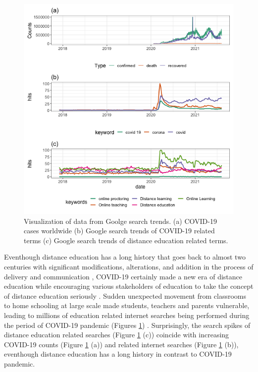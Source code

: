 \documentclass[11pt,a4paper,]{article}
\begin{document}
\begin{figure}[h]

{\centering \includegraphics[width=1\textwidth]{figure/distanceLearningWorldAnalysis-1} 

}

\caption{Visualization of data from Goolge search trends. (a) COVID-19 cases worldwide (b) Google search trends of COVID-19 related terms (c) Google search trends of distance education related terms.}\label{fig:distanceLearningWorldAnalysis}
\end{figure}

Eventhough distance education has a long history that goes back to almost two centuries with significant modifications,
alterations, and addition in the process of delivery and communication \autocite{moore2011learning,spector2014handbook}, COVID-19 certainly made a new era of distance education while encouraging various stakeholders of education to take the concept of distance education seriously \autocite{richmond2020critical}. Sudden unexpected movement from classrooms to home schooling at large scale made students, teachers and parents vulnerable, leading to millions of education related internet searches being performed during the period of COVID-19 pandemic (Figures \ref{fig:distanceLearningWorldAnalysis}) \autocite{carter2021teacher}. Surprisingly, the search spikes of distance education related searches (Figure \ref{fig:distanceLearningWorldAnalysis} (c)) coincide with increasing COVID-19 counts (Figure \ref{fig:distanceLearningWorldAnalysis} (a)) and related internet searches (Figure \ref{fig:distanceLearningWorldAnalysis} (b)), eventhough distance education has a long history in contrast to COVID-19 pandemic.
\end{document}
